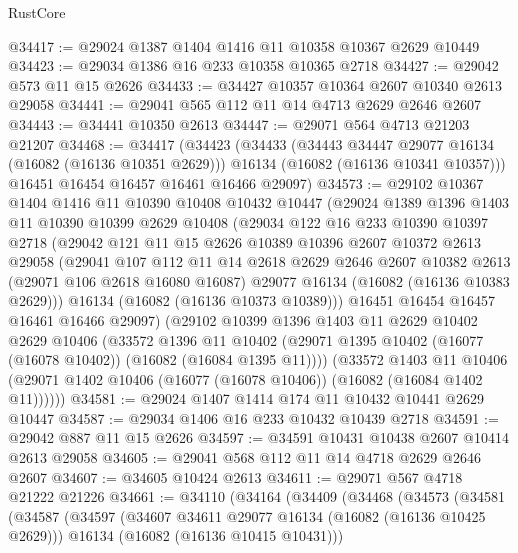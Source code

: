 \begin{lexlean}{RustCore}
\begin{coremodule}
@34417 := @29024 @1387 @1404 @1416 @11 @10358 @10367 @2629 @10449
@34423 := @29034 @1386 @16 @233 @10358 @10365 @2718
@34427 := @29042 @573 @11 @15 @2626
@34433 := @34427 @10357 @10364 @2607 @10340 @2613 @29058
@34441 := @29041 @565 @112 @11 @14 @4713 @2629 @2646 @2607
@34443 := @34441 @10350 @2613
@34447 := @29071 @564 @4713 @21203 @21207
@34468 := @34417
    (@34423
      (@34433
        (@34443 @34447 @29077 @16134 (@16082 (@16136 @10351 @2629)))
        @16134
        (@16082 (@16136 @10341 @10357)))
      @16451
      @16454
      @16457
      @16461
      @16466
      @29097)
@34573 := @29102
    @10367
    @1404
    @1416
    @11
    @10390
    @10408
    @10432
    @10447
    (@29024
      @1389
      @1396
      @1403
      @11
      @10390
      @10399
      @2629
      @10408
      (@29034
        @122
        @16
        @233
        @10390
        @10397
        @2718
        (@29042
          @121
          @11
          @15
          @2626
          @10389
          @10396
          @2607
          @10372
          @2613
          @29058
          (@29041
            @107
            @112
            @11
            @14
            @2618
            @2629
            @2646
            @2607
            @10382
            @2613
            (@29071 @106 @2618 @16080 @16087)
            @29077
            @16134
            (@16082 (@16136 @10383 @2629)))
          @16134
          (@16082 (@16136 @10373 @10389)))
        @16451
        @16454
        @16457
        @16461
        @16466
        @29097)
      (@29102
        @10399
        @1396
        @1403
        @11
        @2629
        @10402
        @2629
        @10406
        (@33572
          @1396
          @11
          @10402
          (@29071 @1395 @10402 (@16077 (@16078 @10402)) (@16082 (@16084 @1395 @11))))
        (@33572
          @1403
          @11
          @10406
          (@29071 @1402 @10406 (@16077 (@16078 @10406)) (@16082 (@16084 @1402 @11))))))
@34581 := @29024 @1407 @1414 @174 @11 @10432 @10441 @2629 @10447
@34587 := @29034 @1406 @16 @233 @10432 @10439 @2718
@34591 := @29042 @887 @11 @15 @2626
@34597 := @34591 @10431 @10438 @2607 @10414 @2613 @29058
@34605 := @29041 @568 @112 @11 @14 @4718 @2629 @2646 @2607
@34607 := @34605 @10424 @2613
@34611 := @29071 @567 @4718 @21222 @21226
@34661 := @34110
    (@34164
      (@34409
        (@34468
          (@34573
            (@34581
              (@34587
                (@34597
                  (@34607 @34611 @29077 @16134 (@16082 (@16136 @10425 @2629)))
                  @16134
                  (@16082 (@16136 @10415 @10431)))

\end{coremodule}
\end{lexlean}
